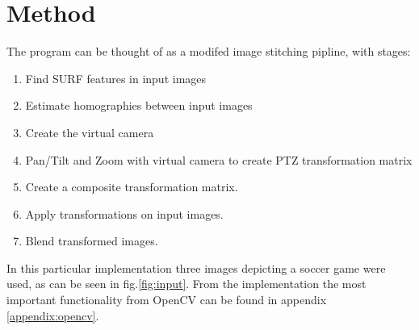 \section{Method}

The program can be thought of as a modifed image stitching pipline, with stages:
\begin{enumerate}
	\item Find SURF features in input images
	\item Estimate homographies between input images
	\item Create the virtual camera
	\item Pan/Tilt and Zoom with virtual camera to create PTZ transformation matrix
	\item Create a composite transformation matrix.
	\item Apply transformations on input images.
	\item Blend transformed images.
\end{enumerate}

In this particular implementation three images depicting a soccer game were used, as can be seen in fig.\ref{fig:input}.
From the implementation the most important functionality from OpenCV can be found in appendix \ref{appendix:opencv}.

